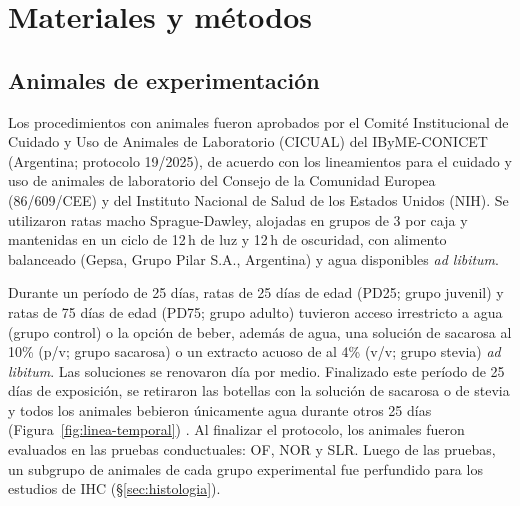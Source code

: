 \chapter{Materiales y métodos}\label{cap:metodos}

\section{Animales de experimentación}\label{sec:diseno}

Los procedimientos con animales fueron aprobados por el Comité Institucional de Cuidado y Uso de Animales de Laboratorio (CICUAL) del IByME-CONICET (Argentina; protocolo 19/2025), de acuerdo con los lineamientos para el cuidado y uso de animales de laboratorio del Consejo de la Comunidad Europea (86/609/CEE) y del Instituto Nacional de Salud de los Estados Unidos (NIH). Se utilizaron ratas macho Sprague-Dawley, alojadas en grupos de 3 por caja y mantenidas en un ciclo de 12\,h de luz y 12\,h de oscuridad, con alimento balanceado (Gepsa, Grupo Pilar S.A., Argentina) y agua disponibles \textit{ad libitum}.

Durante un período de 25 días, ratas de 25 días de edad (PD25; grupo juvenil) y ratas de 75 días de edad (PD75; grupo adulto) tuvieron acceso irrestricto a agua (grupo control) o la opción de beber, además de agua, una solución de sacarosa al 10\% (p/v; grupo sacarosa) o un extracto acuoso de \stevia{} al 4\% (v/v; grupo stevia) \textit{ad libitum}. Las soluciones se renovaron día por medio. Finalizado este período de 25 días de exposición, se retiraron las botellas con la solución de sacarosa o de stevia y todos los animales bebieron únicamente agua durante otros 25 días (Figura~\ref{fig:linea-temporal}) \cite{kruse2019sucrose,coirini2022sucrose}. Al finalizar el protocolo, los animales fueron evaluados en las pruebas conductuales: OF, NOR y SLR. Luego de las pruebas, un subgrupo de animales de cada grupo experimental fue perfundido para los estudios de IHC (\S\ref{sec:histologia}).

